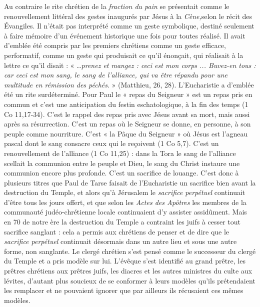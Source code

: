  Au contraire le rite chrétien de la \emph{fraction du pain} se présentait comme le renouvellement littéral des gestes inaugurés par Jésus à la \emph{Cène,}selon le récit des Évangiles. Il n'était pas interprété comme un geste symbolique, destiné seulement à faire mémoire d'un événement historique une fois pour toutes réalisé. Il avait d'emblée été compris par les premiers chrétiens comme un geste efficace, performatif, comme un geste qui produisait ce qu'il énonçait, qui réalisait à la lettre ce qu'il disait : « …\emph{prenez et mangez : ceci est mon corps ... Buvez-en tous : car ceci est mon sang, le sang de l'alliance, qui va être répandu pour une multitude en rémission des péchés}. » (Matthieu, 26, 28). L'Eucharistie a d'emblée été un rite surdéterminé. Pour Paul le « repas du Seigneur » est un repas pris en commun et c'est une anticipation du festin eschatologique, à la fin des temps (1 Co 11,17-34). C'est le rappel des repas pris avec Jésus avant sa mort, mais aussi après sa résurrection. C'est un repas où le Seigneur se donne, en personne, à son peuple comme nourriture. C'est « la Pâque du Seigneur » où Jésus est l'agneau pascal dont le sang consacre ceux qui le reçoivent (1 Co 5,7). C'est un renouvellement de l'alliance (1 Co 11,25) : dans la Tora le sang de l'alliance scellait la communion entre le peuple et Dieu, le sang du Christ instaure une communion encore plus profonde. C'est un sacrifice de louange. C'est donc à plusieurs titres que Paul de Tarse faisait de l'Eucharistie un sacrifice bien avant la destruction du Temple, et alors qu'à Jérusalem le \emph{sacrifice perpétuel} continuait d'être tous les jours offert, et que selon les \emph{Actes des Apôtres} les membres de la communauté judéo-chrétienne locale continuaient d'y assister assidûment.
 Mais en 70 de notre ère la destruction du Temple a contraint les juifs à cesser tout sacrifice sanglant : cela a permis aux chrétiens de penser et de dire que le \emph{sacrifice perpétuel} continuait désormais dans un autre lieu et sous une autre forme, non sanglante. Le clergé chrétien s'est pensé comme le successeur du clergé du Temple et a pris modèle sur lui. L'évêque s'est identifié au grand prêtre, les prêtres chrétiens aux prêtres juifs, les diacres et les autres ministres du culte aux lévites, d'autant plus soucieux de se conformer à leurs modèles qu'ils prétendaient les remplacer et ne pouvaient ignorer que par ailleurs ils récusaient ces mêmes modèles.
